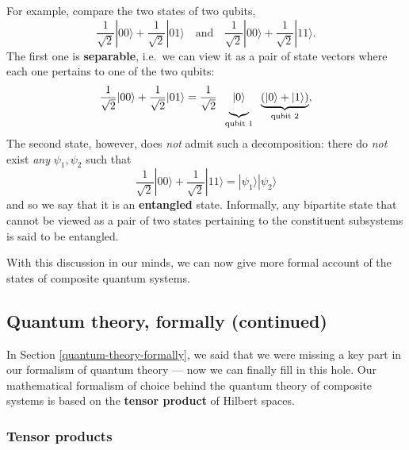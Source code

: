\documentclass[fleqn]{article}
\begin{document}
For example, compare the two states of two qubits,
\[
  \frac{1}{\sqrt{2}}|00\rangle + \frac{1}{\sqrt{2}}|01\rangle
  \quad\text{and}\quad
  \frac{1}{\sqrt{2}}|00\rangle + \frac{1}{\sqrt{2}}|11\rangle.
\]
The first one is \textbf{separable}, i.e.~we can view it as a pair of state vectors where each one pertains to one of the two qubits:
\[
  \frac{1}{\sqrt{2}}|00\rangle + \frac{1}{\sqrt{2}}|01\rangle
  = \frac{1}{\sqrt{2}}
  \;\;
  \underbrace{\vphantom{\frac{1}{\sqrt{2}}}|0\rangle}_{\text{qubit 1}}
  \;\;
  \underbrace{(|0\rangle+|1\rangle)}_{\text{qubit 2}},
\]
The second state, however, does \emph{not} admit such a decomposition: there do \emph{not} exist \emph{any} \(\psi_1,\psi_2\) such that
\[
  \frac{1}{\sqrt{2}}|00\rangle + \frac{1}{\sqrt{2}}|11\rangle
  = |\psi_1\rangle|\psi_2\rangle
\]
and so we say that it is an \textbf{entangled} state.
Informally, any bipartite state that cannot be viewed as a pair of two states pertaining to the constituent subsystems is said to be entangled.

With this discussion in our minds, we can now give more formal account of the states of composite quantum systems.

\hypertarget{quantum-theory-formally-continued}{%
\subsection{Quantum theory, formally (continued)}\label{quantum-theory-formally-continued}}

In Section \ref{quantum-theory-formally}, we said that we were missing a key part in our formalism of quantum theory --- now we can finally fill in this hole.
Our mathematical formalism of choice behind the quantum theory of composite systems is based on the \textbf{tensor product} of Hilbert spaces.

\hypertarget{tensor-products}{%
\subsubsection{Tensor products}\label{tensor-products}}
\end{document}
